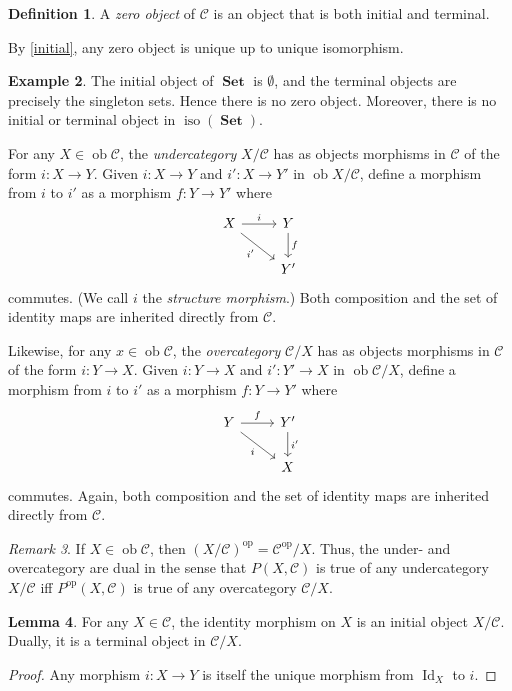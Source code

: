 \documentclass[10pt,letterpaper,cm]{nupset}
\theoremstyle{definition}
\newtheorem{definition}{Definition}[section]
\newtheorem{exmp}[definition]{Example}
\theoremstyle{theorem}
\newtheorem{lemma}[definition]{Lemma}
\theoremstyle{remark}
\newtheorem{remark}[definition]{Remark}
\newcommand{\1}{\mathbf{1}}
\renewcommand{\c}{\mathscr{C}}
\newcommand{\0}{\vec 0}
\DeclareMathOperator{\id}{Id}
\DeclareMathOperator{\op}{op}
\DeclareMathOperator{\ob}{ob}
\DeclareMathOperator{\iso}{iso}
\DeclareMathOperator{\set}{\mathbf{Set}}
\begin{document}
\begin{definition}
A \textit{zero object} of $\c$ is an object that is both initial and terminal.
\end{definition}

By \cref{initial}, any zero object is unique up to unique isomorphism.

\begin{exmp}
The initial object of $\set$ is $\emptyset$, and the terminal objects are precisely the singleton sets. Hence there is no zero object. Moreover, there is no initial or terminal object in $\iso(\set)$.
\end{exmp}


For any $X \in \ob \c$, the \textit{undercategory} ${X}/{\c}$ has as objects morphisms in $\c$ of the form $i : X \to Y$. Given $i: X \to Y$ and  $i' : X \to Y'$ in $\ob {X}/{\c}$, define a  morphism from $i$ to $i'$ as a morphism $f: Y \to Y'$ where
\[ \begin{tikzcd}
X \arrow[r, "i"] \arrow[swap, dr,  " i' "] & Y \arrow[d, "f"] \\%
 & Y'
\end{tikzcd}
\]
commutes. (We call $i$ the \textit{structure morphism}.)
Both composition and the set of identity maps are inherited directly from $\c$.

Likewise, for any $x \in \ob \c$, the \textit{overcategory} ${\c}/{X}$ has as objects morphisms in $\c$ of the form $i : Y \to X$. Given $i:  Y \to X$ and  $i' : Y' \to X$ in $\ob {\c}/{X}$, define a morphism from $i$ to $i'$ as a morphism $f: Y \to Y'$ where
\[ \begin{tikzcd}
Y \arrow[r, "f"] \arrow[swap, dr,  " i "] & Y' \arrow[d, "i '"] \\%
 & X
\end{tikzcd}
\]
commutes.
Again, both composition and the set of identity maps are inherited directly from $\c$.


\begin{remark}
If $X \in \ob \c$, then $\left({X}/{\c}\right)^{\op} = {\c^{\op}}/{X}$. Thus, the under- and overcategory are dual in the sense that $P(X, \c)$ is true of any undercategory ${X}/{\c}$ iff $P^{\op}(X, \c)$ is true of any overcategory ${\c}/{X}$. 
\end{remark}

\begin{lemma}
For any $X \in \c$, the identity morphism on $X$ is an initial object ${X}/{\c}$. Dually, it is a terminal object in ${\c}/{X}$.
\end{lemma}
\begin{proof}
Any morphism $i: X \to Y$ is itself the unique morphism from $\id_X$ to $i$.
\end{proof}
\end{document}
